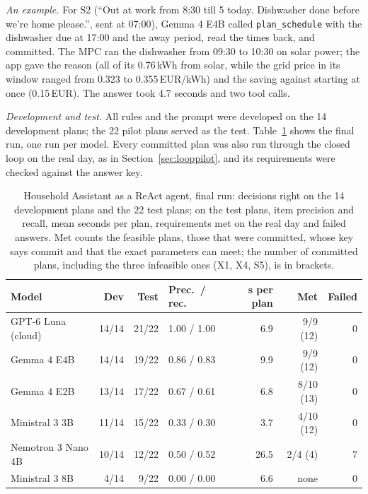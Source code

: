\textit{An example.} For S2 (``Out at work from 8:30 till 5 today.
Dishwasher done before we're home please.'', sent at 07:00), Gemma 4
E4B called \texttt{plan\_schedule} with the dishwasher due at 17:00 and
the away period, read the times back, and committed. The MPC ran the
dishwasher from 09:30 to 10:30 on solar power; the app gave the reason
(all of its 0.76\,kWh from solar, while the grid price in its window
ranged from 0.323 to 0.355\,EUR/kWh) and the saving against starting at
once (0.15\,EUR). The answer took 4.7 seconds and two tool calls.

\textit{Development and test.} All rules and the prompt were developed
on the 14 development plans; the 22 pilot plans served as the test.
Table~\ref{tab:reactgateway} shows the final run, one run per model.
Every committed plan was also run through the closed loop on the real
day, as in Section~\ref{sec:looppilot}, and its requirements were
checked against the answer key.

\begin{table}[htbp]
\caption{Household Assistant as a ReAct agent, final run: decisions
right on the 14 development plans and the 22 test plans; on the test
plans, item precision and recall, mean seconds per plan, requirements
met on the real day and failed answers. Met counts the feasible plans,
those that were committed, whose key says commit and that the exact
parameters can meet; the number of committed plans, including the three
infeasible ones (X1, X4, S5), is in brackets.}
\label{tab:reactgateway}
\small
\begin{tabularx}{\textwidth}{@{}Xrrlrrr@{}}
\toprule
Model & Dev & Test & Prec.\ / rec. & s per plan & Met & Failed \\
\midrule
GPT-6 Luna (cloud) & 14/14 & 21/22 & 1.00 / 1.00 & 6.9 & 9/9 (12) & 0 \\
Gemma 4 E4B & 14/14 & 19/22 & 0.86 / 0.83 & 9.9 & 9/9 (12) & 0 \\
Gemma 4 E2B & 13/14 & 17/22 & 0.67 / 0.61 & 6.8 & 8/10 (13) & 0 \\
Ministral 3 3B & 11/14 & 15/22 & 0.33 / 0.30 & 3.7 & 4/10 (12) & 0 \\
Nemotron 3 Nano 4B & 10/14 & 12/22 & 0.50 / 0.52 & 26.5 & 2/4 (4) & 7 \\
Ministral 3 8B & 4/14 & 9/22 & 0.00 / 0.00 & 6.6 & none & 0 \\
\bottomrule
\end{tabularx}
\end{table}

